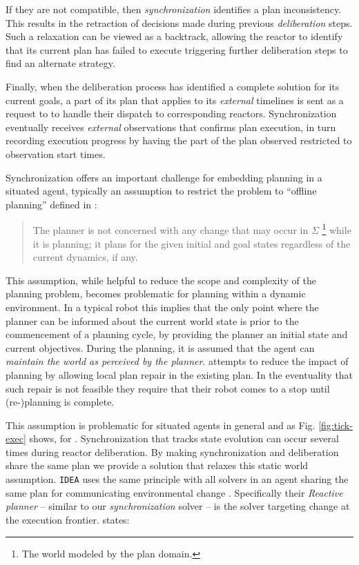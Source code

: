 If they are not compatible, then {\em synchronization} identifies a
plan inconsistency. This results in the retraction of decisions made
during previous {\em deliberation} steps.  Such a relaxation can be
viewed as a backtrack, allowing the reactor to identify that its
current plan has failed to execute triggering further deliberation
steps to find an alternate strategy.

Finally, when the deliberation process has identified a complete
solution for its current goals, a part of its plan that applies to its
{\em external} timelines is sent as a request to \rx to handle their
dispatch to corresponding reactors.  Synchronization eventually
receives {\em external } observations that confirms plan execution, in
turn recording execution progress by having the part of the plan
observed restricted to observation start times.

Synchronization offers an important challenge for embedding planning
in a situated agent, typically an assumption to restrict the problem
to ``offline planning'' defined in \cite{ghallab04}:

{\scriptsize
  \begin{quote}
    The planner is not concerned with any change that may occur in
    $\Sigma$ \footnote{The world modeled by the plan domain.} while it
    is planning; it plans for the given initial and goal states
    regardless of the current dynamics, if any.
\end{quote}}

This assumption, while helpful to reduce the scope and complexity of
the planning problem, becomes problematic for planning within a
dynamic environment. In a typical robot this implies that the only
point where the planner can be informed about the current world state
is prior to the commencement of a planning cycle, by providing the
planner an initial state and current objectives. During the planning,
it is assumed that the agent can \emph{maintain the world as perceived
  by the planner}. \cite{lemai04, lemai-chenevier2004} attempts to
reduce the impact of planning by allowing local plan repair in the
existing plan. In the eventuality that such repair is not feasible
they require that their robot comes to a stop until (re-)planning is
complete.

This assumption is problematic for situated agents in general and as
Fig. \ref{fig:tick-exec} shows, for \rxe. Synchronization that tracks
state evolution can occur several times during reactor
deliberation. By making synchronization and deliberation share the
same plan we provide a solution that relaxes this static world
assumption. \texttt{IDEA} uses the same principle with all solvers in
an agent sharing the same plan for communicating environmental change
\cite{Dias:2003ua, mus06}. Specifically their {\em Reactive planner}
-- similar to our {\em synchronization} solver -- is the solver
targeting change at the execution frontier.  \cite{Dias:2003ua}
states:

